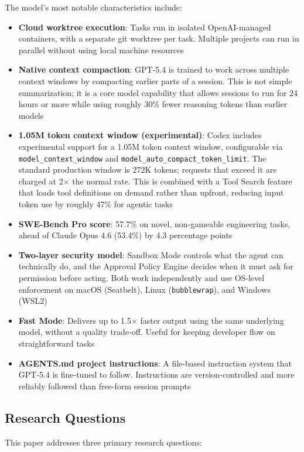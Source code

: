 \documentclass[conference]{IEEEtran}
\begin{document}
The model's most notable characteristics include:
\begin{itemize}
    \item \textbf{Cloud worktree execution}: Tasks run in isolated OpenAI-managed containers, with a separate git worktree per task. Multiple projects can run in parallel without using local machine resources \cite{openai_cloud_envs}
    \item \textbf{Native context compaction}: GPT-5.4 is trained to work across multiple context windows by compacting earlier parts of a session. This is not simple summarization; it is a core model capability that allows sessions to run for 24 hours or more while using roughly 30\% fewer reasoning tokens than earlier models \cite{openai_compaction}
    \item \textbf{1.05M token context window (experimental)}: Codex includes experimental support for a 1.05M token context window, configurable via \texttt{model\_context\_window} and \texttt{model\_auto\_compact\_token\_limit}. The standard production window is 272K tokens; requests that exceed it are charged at 2$\times$ the normal rate. This is combined with a Tool Search feature that loads tool definitions on demand rather than upfront, reducing input token use by roughly 47\% for agentic tasks \cite{openai_compaction}
    \item \textbf{SWE-Bench Pro score}: 57.7\% on novel, non-gameable engineering tasks, ahead of Claude Opus 4.6 (53.4\%) by 4.3 percentage points \cite{morphllm2026}
    \item \textbf{Two-layer security model}: Sandbox Mode controls what the agent can technically do, and the Approval Policy Engine decides when it must ask for permission before acting. Both work independently and use OS-level enforcement on macOS (Seatbelt), Linux (\texttt{bubblewrap}), and Windows (WSL2) \cite{openai_codex_docs}
    \item \textbf{Fast Mode}: Delivers up to 1.5$\times$ faster output using the same underlying model, without a quality trade-off. Useful for keeping developer flow on straightforward tasks \cite{holter2026}
    \item \textbf{AGENTS.md project instructions}: A file-based instruction system that GPT-5.4 is fine-tuned to follow. Instructions are version-controlled and more reliably followed than free-form session prompts
\end{itemize}

\subsection{Research Questions}
This paper addresses three primary research questions:
\end{document}
